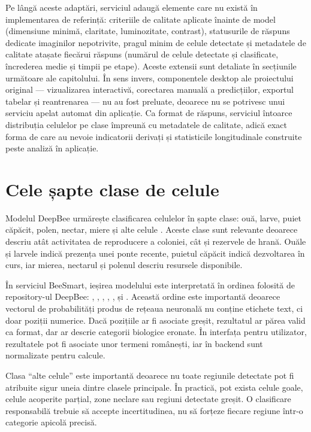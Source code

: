 Pe lângă aceste adaptări, serviciul adaugă elemente care nu există în implementarea de referință: criteriile de calitate aplicate înainte de model (dimensiune minimă, claritate, luminozitate, contrast), statusurile de răspuns dedicate imaginilor nepotrivite, pragul minim de celule detectate și metadatele de calitate atașate fiecărui răspuns (numărul de celule detectate și clasificate, încrederea medie și timpii pe etape). Aceste extensii sunt detaliate în secțiunile următoare ale capitolului. În sens invers, componentele desktop ale proiectului original — vizualizarea interactivă, corectarea manuală a predicțiilor, exportul tabelar și reantrenarea — nu au fost preluate, deoarece nu se potrivesc unui serviciu apelat automat din aplicație. Ca format de răspuns, serviciul întoarce distribuția celulelor pe clase împreună cu metadatele de calitate, adică exact forma de care au nevoie indicatorii derivați și statisticile longitudinale construite peste analiză în aplicație.

\section{Cele șapte clase de celule}

Modelul DeepBee urmărește clasificarea celulelor în șapte clase: ouă, larve, puiet căpăcit, polen, nectar, miere și alte celule \cite{deepbeeArticle}. Aceste clase sunt relevante deoarece descriu atât activitatea de reproducere a coloniei, cât și rezervele de hrană. Ouăle și larvele indică prezența unei ponte recente, puietul căpăcit indică dezvoltarea în curs, iar mierea, nectarul și polenul descriu resursele disponibile.

În serviciul BeeSmart, ieșirea modelului este interpretată în ordinea folosită de repository-ul DeepBee: , , , , ,  și . Această ordine este importantă deoarece vectorul de probabilități produs de rețeaua neuronală nu conține etichete text, ci doar poziții numerice. Dacă pozițiile ar fi asociate greșit, rezultatul ar părea valid ca format, dar ar descrie categorii biologice eronate. În interfața pentru utilizator, rezultatele pot fi asociate unor termeni românești, iar în backend sunt normalizate pentru calcule.

Clasa \enquote{alte celule} este importantă deoarece nu toate regiunile detectate pot fi atribuite sigur uneia dintre clasele principale. În practică, pot exista celule goale, celule acoperite parțial, zone neclare sau regiuni detectate greșit. O clasificare responsabilă trebuie să accepte incertitudinea, nu să forțeze fiecare regiune într-o categorie apicolă precisă.

